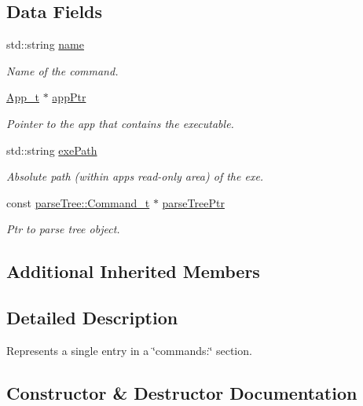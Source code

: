 \subsection*{Data Fields}
\begin{DoxyCompactItemize}
\item 
std\+::string \hyperlink{struct_command__t_a57ebbc551ac7a91994f2fa4e6bae1c23}{name}
\begin{DoxyCompactList}\small\item\em Name of the command. \end{DoxyCompactList}\item 
\hyperlink{struct_app__t}{App\+\_\+t} $\ast$ \hyperlink{struct_command__t_a74e919147e7102de5a72313e0aff1a7a}{app\+Ptr}
\begin{DoxyCompactList}\small\item\em Pointer to the app that contains the executable. \end{DoxyCompactList}\item 
std\+::string \hyperlink{struct_command__t_ae11a7f73f62be79600146a670d22f064}{exe\+Path}
\begin{DoxyCompactList}\small\item\em Absolute path (within app\textquotesingle{}s read-\/only area) of the exe. \end{DoxyCompactList}\item 
const \hyperlink{structparse_tree_1_1_command__t}{parse\+Tree\+::\+Command\+\_\+t} $\ast$ \hyperlink{struct_command__t_a624ae1e76751f5f4eaf2d7a9a0ba1e76}{parse\+Tree\+Ptr}
\begin{DoxyCompactList}\small\item\em Ptr to parse tree object. \end{DoxyCompactList}\end{DoxyCompactItemize}
\subsection*{Additional Inherited Members}


\subsection{Detailed Description}
Represents a single entry in a \char`\"{}commands\+:\char`\"{} section. 

\subsection{Constructor \& Destructor Documentation}
